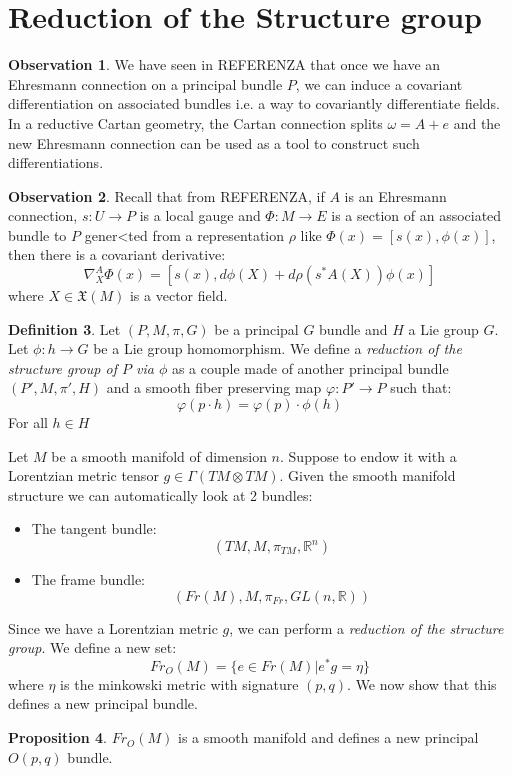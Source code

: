 \documentclass[12pt,a4paper]{report}
\theoremstyle{definition}
\newtheorem{Def}{Definition}[chapter]
\theoremstyle{Theorem}
\newtheorem{Prop}[Def]{Proposition}
\theoremstyle{break}
\theoremstyle{definition}
\newtheorem{Obs}[Def]{Observation}
\begin{document}
	\section{Reduction of the Structure group}
	\begin{Obs}
		We have seen in REFERENZA that once we have an Ehresmann connection on a principal bundle $P$, we can induce a covariant differentiation on associated bundles i.e. a way to covariantly differentiate fields. In a reductive Cartan geometry, the Cartan connection splits $\omega=A+e$ and the new Ehresmann connection can be used as a tool to construct such differentiations.
	\end{Obs}
	\begin{Obs}
		Recall that from REFERENZA, if $A$ is an Ehresmann connection, $s:U\rightarrow P$ is a local gauge and $\Phi:M\rightarrow E$ is a section of an associated bundle to $P$ gener<ted from a representation $\rho$ like $\Phi(x)=[s(x), \phi(x)]$, then there is a covariant derivative:
		$$\nabla^A_X\Phi(x)=[s(x),d\phi(X)+d\rho(s^*A(X))\phi(x)]$$
		where $X\in\mathfrak{X}(M)$ is a vector field.
	\end{Obs}
	\begin{Def}
		Let $(P,M,\pi,G)$ be a principal $G$ bundle and $H$ a Lie group $G$. Let $\phi:h\rightarrow G$ be a Lie group homomorphism. We define a \textit{reduction of the structure group of $P$ via $\phi$} as a couple made of another principal bundle $(P',M,\pi',H)$ and a smooth fiber preserving map $\varphi: P'\rightarrow P$ such that:
		$$\varphi(p\cdot h)=\varphi(p)\cdot \phi(h)$$
		For all $h\in H$
	\end{Def}
		Let $M$ be a smooth manifold of dimension $n$. Suppose to endow it with a Lorentzian metric tensor $g\in\Gamma(TM\otimes TM)$. Given the smooth manifold structure we can automatically look at 2 bundles:
		\begin{itemize}
			\item[1] The tangent bundle:
			$$(TM,M,\pi_{TM},\mathbb{R}^n)$$
			\item[2] The frame bundle:
			$$(Fr(M),M,\pi_{Fr},GL(n,\mathbb{R}))$$
		\end{itemize}
		Since we have a Lorentzian metric $g$, we can perform a \textit{reduction of the structure group}. We define a new set:
		$$Fr_O(M)=\{e\in Fr(M)|e^*g=\eta\}$$
		where $\eta$ is the minkowski metric with signature $(p,q)$. We now show that this defines a new principal bundle.
		\begin{Prop}
			$Fr_O(M)$ is a smooth manifold and defines a new principal $O(p,q)$ bundle.
		\end{Prop}
\end{document}

